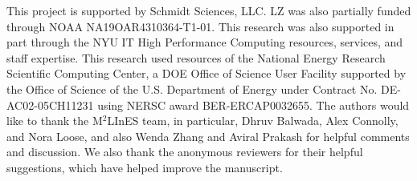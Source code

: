 \documentclass[draft]{agujournal2019}
\begin{document}
\acknowledgments
This project is supported by Schmidt Sciences, LLC. 
LZ was also partially funded through NOAA NA19OAR4310364-T1-01. 
This research was also supported in part through the NYU IT High Performance
Computing resources, services, and staff expertise. This research used resources of the National Energy Research Scientific Computing Center, a DOE Office of Science User Facility supported by the Office of Science of the U.S. Department of Energy under Contract No. DE-AC02-05CH11231 using NERSC award BER-ERCAP0032655. The authors would like to thank the M$^2$LInES team, in particular, Dhruv Balwada, Alex Connolly, and Nora Loose, and also Wenda Zhang and Aviral Prakash for helpful comments and discussion. We also thank the anonymous reviewers for their helpful suggestions, which have helped improve the manuscript. %
%
%

%






%
%
%
%
%
\end{document}
